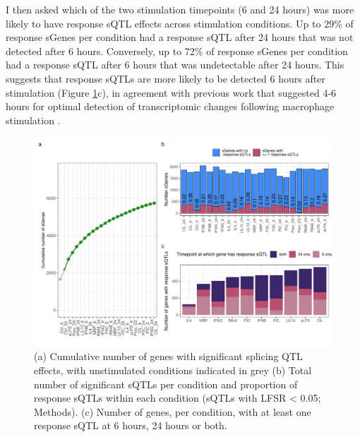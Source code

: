 I then asked which of the two stimulation timepoints (6 and 24 hours) was more likely to have response sQTL effects across stimulation conditions. Up to 29\% of response sGenes per condition had a response sQTL after 24 hours that was not detected after 6 hours. Conversely, up to 72\% of response sGenes per condition had a response sQTL after 6 hours that was  undetectable after 24 hours. This suggests that response sQTLs are more likely to be detected 6 hours after stimulation (Figure \ref{fig:sqtl}c), in agreement with previous work that suggested 4-6 hours for optimal detection of transcriptomic changes following macrophage stimulation \cite{Unuvar_Purcu2022-zq,Sharif2007-np}. \\
\begin{figure}[H]
  \centering
  \includegraphics[width=\textwidth]{sqtl}
  \caption[Splicing QTL mapping, timepoint-specificity and condition-specificity results]{(a) Cumulative number of genes with significant splicing QTL effects, with unstimulated conditions indicated in grey (b) Total number of significant sQTLs per condition and proportion of response sQTLs within each condition (sQTLs with LFSR < 0.05; Methods). (c) Number of genes, per condition, with at least one response sQTL at 6 hours, 24 hours or both.}
  \label{fig:sqtl}   
\end{figure}

